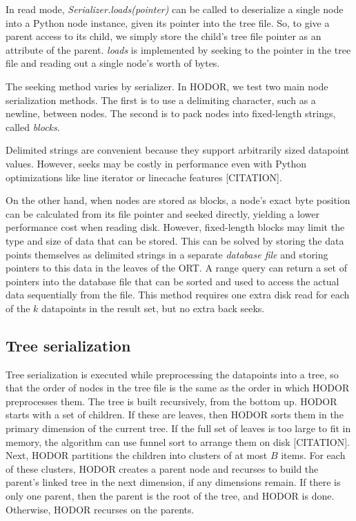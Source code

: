 \documentclass[11pt, oneside]{article}
\newcommand{\ms}{\textit}
\begin{document}
In read mode, \ms{Serializer.loads(pointer)} can be called to deserialize a
single node into a Python node instance, given its pointer into the tree file.
So, to give a parent access to its child, we simply store the child's tree file
pointer as an attribute of the parent. \ms{loads} is implemented by seeking to
the pointer in the tree file and reading out a single node's worth of bytes.

The seeking method varies by serializer. In HODOR, we test two main node
serialization methods. The first is to use a delimiting character, such as a
newline, between nodes. The second is to pack nodes into fixed-length strings,
called \textit{blocks}. 

Delimited strings are convenient because they support
arbitrarily sized datapoint values. However, seeks may be costly in performance
even with Python optimizations like line iterator or linecache features
[CITATION]. 

On the other hand, when nodes are stored as blocks, a node's exact byte
position can be calculated from its file pointer and seeked directly, yielding
a lower performance cost when reading disk. However, fixed-length blocks may
limit the type and size of data that can be stored. This can be solved by
storing the data points themselves as delimited strings in a separate
\textit{database file} and storing pointers to this data in the leaves of the
ORT. A range query can return a set of pointers into the database file that can
be sorted and used to access the actual data sequentially from the file. This
method requires one extra disk read for each of the $k$ datapoints in the
result set, but no extra back seeks.


\subsection{Tree serialization}

Tree serialization is executed while preprocessing the datapoints into a tree,
so that the order of nodes in the tree file is the same as the order in which
HODOR preprocesses them. The tree is built recursively, from the bottom up.
HODOR starts with a set of children. If these are leaves, then HODOR sorts them
in the primary dimension of the current tree. If the full set of leaves is too
large to fit in memory, the algorithm can use funnel sort to arrange them on
disk [CITATION]. Next, HODOR partitions the children into clusters of at most $B$ items.
For each of these clusters, HODOR creates a parent node and recurses to build
the parent's linked tree in the next dimension, if any dimensions remain. If
there is only one parent, then the parent is the root of the tree, and HODOR is
done.  Otherwise, HODOR recurses on the parents.
\end{document}
